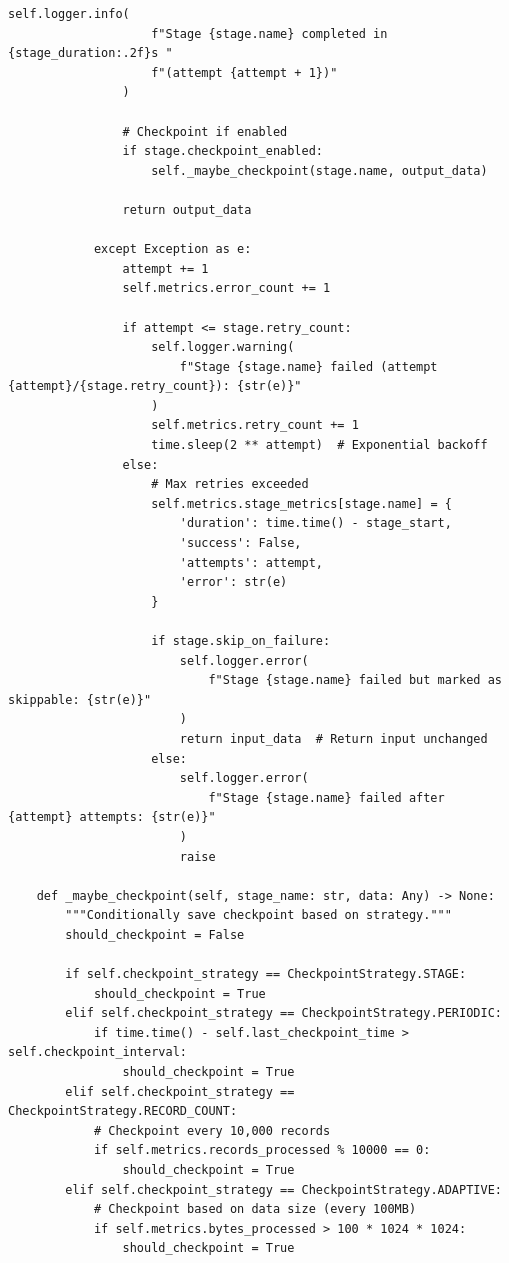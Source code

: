 \begin{lstlisting}[style=python, caption=DataPipeline with Full Lifecycle Management]
                self.logger.info(
                    f"Stage {stage.name} completed in {stage_duration:.2f}s "
                    f"(attempt {attempt + 1})"
                )

                # Checkpoint if enabled
                if stage.checkpoint_enabled:
                    self._maybe_checkpoint(stage.name, output_data)

                return output_data

            except Exception as e:
                attempt += 1
                self.metrics.error_count += 1

                if attempt <= stage.retry_count:
                    self.logger.warning(
                        f"Stage {stage.name} failed (attempt {attempt}/{stage.retry_count}): {str(e)}"
                    )
                    self.metrics.retry_count += 1
                    time.sleep(2 ** attempt)  # Exponential backoff
                else:
                    # Max retries exceeded
                    self.metrics.stage_metrics[stage.name] = {
                        'duration': time.time() - stage_start,
                        'success': False,
                        'attempts': attempt,
                        'error': str(e)
                    }

                    if stage.skip_on_failure:
                        self.logger.error(
                            f"Stage {stage.name} failed but marked as skippable: {str(e)}"
                        )
                        return input_data  # Return input unchanged
                    else:
                        self.logger.error(
                            f"Stage {stage.name} failed after {attempt} attempts: {str(e)}"
                        )
                        raise

    def _maybe_checkpoint(self, stage_name: str, data: Any) -> None:
        """Conditionally save checkpoint based on strategy."""
        should_checkpoint = False

        if self.checkpoint_strategy == CheckpointStrategy.STAGE:
            should_checkpoint = True
        elif self.checkpoint_strategy == CheckpointStrategy.PERIODIC:
            if time.time() - self.last_checkpoint_time > self.checkpoint_interval:
                should_checkpoint = True
        elif self.checkpoint_strategy == CheckpointStrategy.RECORD_COUNT:
            # Checkpoint every 10,000 records
            if self.metrics.records_processed % 10000 == 0:
                should_checkpoint = True
        elif self.checkpoint_strategy == CheckpointStrategy.ADAPTIVE:
            # Checkpoint based on data size (every 100MB)
            if self.metrics.bytes_processed > 100 * 1024 * 1024:
                should_checkpoint = True


\end{lstlisting}
